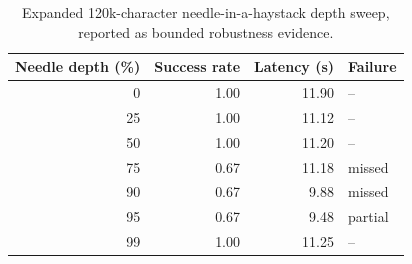 \begin{table}[htbp]
\centering
\caption{Expanded 120k-character needle-in-a-haystack depth sweep, reported as bounded robustness evidence.}
\label{tab:long-context-robustness}
\small
\setlength{\tabcolsep}{4pt}
\begin{tabular}{r r r l}
\hline
Needle depth (\%) & Success rate & Latency (s) & Failure \\
\hline
0 & 1.00 & 11.90 & -- \\
25 & 1.00 & 11.12 & -- \\
50 & 1.00 & 11.20 & -- \\
75 & 0.67 & 11.18 & missed \\
90 & 0.67 & 9.88 & missed \\
95 & 0.67 & 9.48 & partial \\
99 & 1.00 & 11.25 & -- \\
\hline
\end{tabular}
\end{table}
